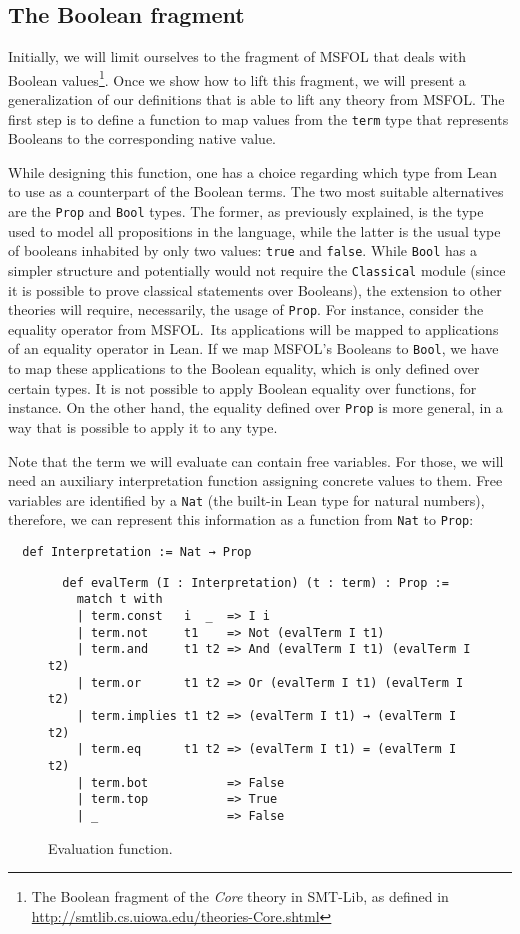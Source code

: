 \subsection{The Boolean fragment}

Initially, we will limit ourselves to the fragment of MSFOL that
deals with Boolean values\footnote{The Boolean fragment of the
\emph{Core} theory in SMT-Lib, as defined in
\url{http://smtlib.cs.uiowa.edu/theories-Core.shtml}}. Once
we show how to lift this fragment, we will present a generalization
of our definitions that is able to lift any theory from MSFOL.
%
The first step is to define a function to map values from the \texttt{term} type
that represents Booleans to the corresponding native value.

While designing this function, one has a
choice regarding which type from Lean to use as a counterpart of the Boolean terms. The two
most suitable alternatives are the \texttt{Prop} and \texttt{Bool} types. The former, as
previously explained, is the type used to model all propositions in the language, while
the latter is the usual type of booleans inhabited by only two values: \texttt{true} and
\texttt{false}. While \texttt{Bool} has a simpler structure and potentially would not
require the \texttt{Classical} module (since it is possible to prove classical statements over Booleans),
the extension to other theories will require, necessarily, the usage of \texttt{Prop}. For instance,
consider the equality operator from MSFOL.\ Its applications will be mapped to applications of an equality operator
in Lean. If we map MSFOL's Booleans to \texttt{Bool}, we have to map these applications to the
Boolean equality, which is only defined over certain types. It is not possible
to apply Boolean equality over functions, for instance. On the other hand, the equality
defined over \texttt{Prop} is more general, in a way that is possible to apply it to any type.

Note that the term we will evaluate can contain free variables. For those, we will need an auxiliary interpretation function assigning concrete values to them.
Free variables are
identified by a \texttt{Nat} (the built-in Lean type for natural numbers), therefore, we can
represent this information as a function from \texttt{Nat} to
\texttt{Prop}:

\begin{verbatim}
  def Interpretation := Nat → Prop
\end{verbatim}


\begin{figure}[t]
\begin{verbatim}
  def evalTerm (I : Interpretation) (t : term) : Prop :=
    match t with
    | term.const   i  _  => I i
    | term.not     t1    => Not (evalTerm I t1)
    | term.and     t1 t2 => And (evalTerm I t1) (evalTerm I t2)
    | term.or      t1 t2 => Or (evalTerm I t1) (evalTerm I t2)
    | term.implies t1 t2 => (evalTerm I t1) → (evalTerm I t2)
    | term.eq      t1 t2 => (evalTerm I t1) = (evalTerm I t2)
    | term.bot           => False
    | term.top           => True
    | _                  => False
\end{verbatim}
\caption{Evaluation function.}\label{evalTerm1}
\end{figure}

